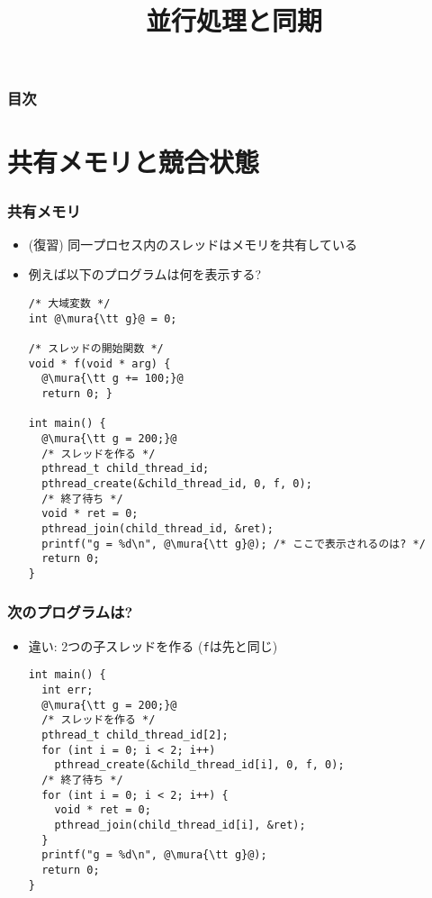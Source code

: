 \documentclass[12pt,dvipdfmx]{beamer}
\title{並行処理と同期}
\begin{document}
\maketitle

\begin{frame}
\frametitle{目次}
\tableofcontents
\end{frame}

\section{共有メモリと競合状態}

\begin{frame}[fragile]
  \frametitle{共有メモリ}
  \begin{itemize}
  \item (復習) 同一プロセス内のスレッドはメモリを共有している
  \item 例えば以下のプログラムは何を表示する?

\begin{lstlisting}
/* 大域変数 */
int @\mura{\tt g}@ = 0;

/* スレッドの開始関数 */
void * f(void * arg) {
  @\mura{\tt g += 100;}@
  return 0; }

int main() {
  @\mura{\tt g = 200;}@
  /* スレッドを作る */
  pthread_t child_thread_id;
  pthread_create(&child_thread_id, 0, f, 0);
  /* 終了待ち */
  void * ret = 0;
  pthread_join(child_thread_id, &ret);
  printf("g = %d\n", @\mura{\tt g}@); /* ここで表示されるのは? */
  return 0;
}
\end{lstlisting} 
  \end{itemize}
\end{frame} 

\begin{frame}[fragile]
  \frametitle{次のプログラムは?}
  \begin{itemize}
  \item 違い: 2つの子スレッドを作る ({\tt f}は先と同じ)
\begin{lstlisting}
int main() {
  int err;
  @\mura{\tt g = 200;}@
  /* スレッドを作る */
  pthread_t child_thread_id[2];
  for (int i = 0; i < 2; i++)
    pthread_create(&child_thread_id[i], 0, f, 0);
  /* 終了待ち */
  for (int i = 0; i < 2; i++) {
    void * ret = 0;
    pthread_join(child_thread_id[i], &ret);
  }
  printf("g = %d\n", @\mura{\tt g}@);
  return 0;
}
\end{lstlisting} 
\end{itemize}
\end{frame}
\end{document}

